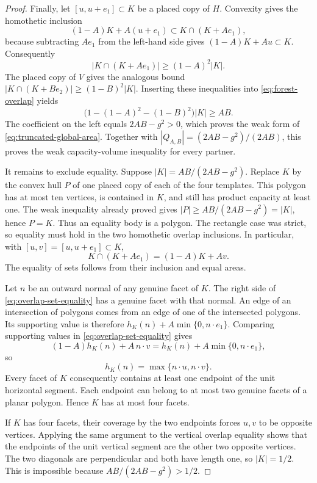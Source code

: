 \begin{proof}
Finally, let $[u,u+e_1]\subset K$ be a placed copy of $H$.
Convexity gives the homothetic inclusion
\[
 (1-A)K+A(u+e_1)\subset K\cap(K+Ae_1),
\]
because subtracting $Ae_1$ from the left-hand side gives
$(1-A)K+Au\subset K$. Consequently
\[
 |K\cap(K+Ae_1)|\geq(1-A)^2|K|.
\]
The placed copy of $V$ gives the analogous bound
$|K\cap(K+Be_2)|\geq(1-B)^2|K|$. Inserting these inequalities
into \eqref{eq:forest-overlap} yields
\[
 \bigl(1-(1-A)^2-(1-B)^2\bigr)|K|\geq AB.
\]
The coefficient on the left equals $2AB-g^2>0$, which proves
the weak form of \eqref{eq:truncated-global-area}. Together with
$|Q_{A,B}|=(2AB-g^2)/(2AB)$, this proves the weak capacity-volume
inequality for every partner.

It remains to exclude equality. Suppose $|K|=AB/(2AB-g^2)$.
Replace $K$ by the convex hull $P$ of one placed copy of each of the four
templates. This polygon has at most ten vertices, is contained in $K$,
and still has product capacity at least one. The weak inequality already
proved gives $|P|\geq AB/(2AB-g^2)=|K|$, hence $P=K$.
Thus an equality body is a polygon. The rectangle case was strict, so
equality must hold in the two homothetic overlap inclusions. In particular,
with $[u,v]=[u,u+e_1]\subset K$,
\begin{equation}\label{eq:overlap-set-equality}
 K\cap(K+Ae_1)=(1-A)K+Av.
\end{equation}
The equality of sets follows from their inclusion and equal areas.

Let $n$ be an outward normal of any genuine facet of $K$.
The right side of \eqref{eq:overlap-set-equality} has a genuine facet
with that normal. An edge of an intersection of polygons comes from an
edge of one of the intersected polygons. Its supporting value is therefore
$h_K(n)+A\min\{0,n\cdot e_1\}$. Comparing supporting values in
\eqref{eq:overlap-set-equality} gives
\[
 (1-A)h_K(n)+A\,n\cdot v
 =h_K(n)+A\min\{0,n\cdot e_1\},
\]
so
\[
 h_K(n)=\max\{n\cdot u,n\cdot v\}.
\]
Every facet of $K$ consequently contains at least one endpoint of the unit
horizontal segment. Each endpoint can belong to at most two genuine
facets of a planar polygon. Hence $K$ has at most four facets.

If $K$ has four facets, their coverage by the two endpoints forces $u,v$
to be opposite vertices. Applying the same argument to the vertical
overlap equality shows that the endpoints of the unit vertical segment
are the other two opposite vertices. The two diagonals are perpendicular
and both have length one, so $|K|=1/2$. This is impossible because
$AB/(2AB-g^2)>1/2$.


\end{proof}
